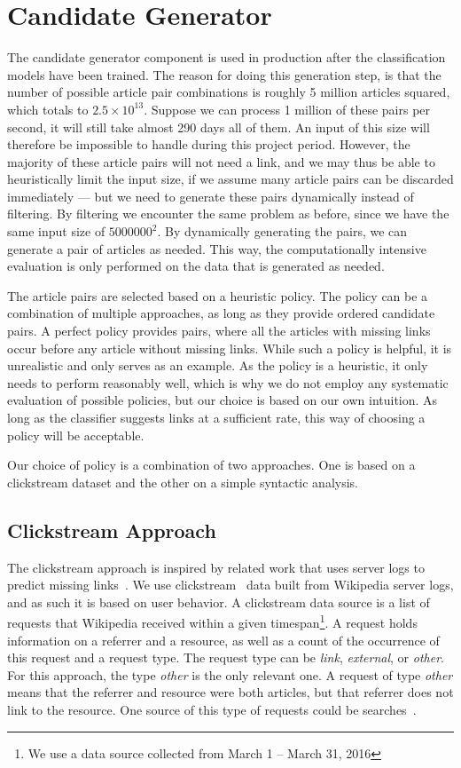 \section{Candidate Generator}
The candidate generator component is used in production after the classification models have been trained. The reason for doing this generation step, is that the number of possible article pair combinations is roughly 5 million articles squared, which totals to $2.5 \times 10^{13}$. Suppose we can process 1 million of these pairs per second, it will still take almost 290 days all of them. An input of this size will therefore be impossible to handle during this project period. However, the majority of these article pairs will not need a link, and we may thus be able to heuristically limit the input size, if we assume many article pairs can be discarded immediately --- but we need to generate these pairs dynamically instead of filtering. By filtering we encounter the same problem as before, since we have the same input size of $\num{5000000}^2$. By dynamically generating the pairs, we can generate a pair of articles as needed. This way, the computationally intensive evaluation is only performed on the data that is generated as needed.

The article pairs are selected based on a heuristic policy. The policy can be a combination of multiple approaches, as long as they provide ordered candidate pairs. A perfect policy provides pairs, where all the articles with missing links occur before any article without missing links. While such a policy is helpful, it is unrealistic and only serves as an example. As the policy is a heuristic, it only needs to perform reasonably well, which is why we do not employ any systematic evaluation of possible policies, but our choice is based on our own intuition. As long as the classifier suggests links at a sufficient rate, this way of choosing a policy will be acceptable.

Our choice of policy is a combination of two approaches. One is based on a clickstream dataset and the other on a simple syntactic analysis.

\subsection{Clickstream Approach}

The clickstream approach is inspired by related work that uses server logs to predict missing links~\cite{hyperlink-structure-using-logs}. We use clickstream~\cite{wiki-clickstream} data built from Wikipedia server logs, and as such it is based on user behavior. A clickstream data source is a list of requests that Wikipedia received within a given timespan\footnote{We use a data source collected from March 1 -- March 31, 2016}. A request holds information on a referrer and a resource, as well as a count of the occurrence of this request and a request type. The request type can be \emph{link}, \emph{external}, or \emph{other}. For this approach, the type \emph{other} is the only relevant one. A request of type \emph{other} means that the referrer and resource were both articles, but that referrer does not link to the resource. One source of this type of requests could be searches~\cite{wiki-clickstream}.

